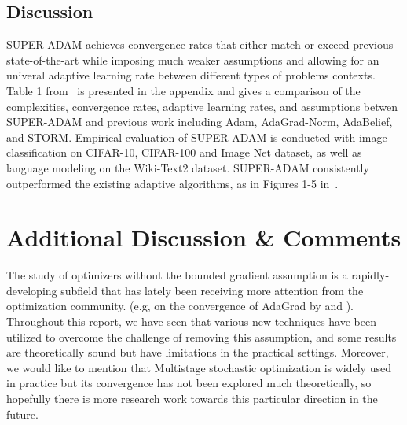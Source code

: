 \documentclass{article}
\begin{document}
\subsection{Discussion}
SUPER-ADAM achieves convergence rates that either match or exceed previous state-of-the-art while imposing much weaker assumptions and allowing for an univeral adaptive learning rate between different types of problems contexts.
Table 1 from~\cite{https://doi.org/10.48550/arxiv.2106.08208} is presented in the appendix and gives a comparison of the complexities, convergence rates, adaptive learning rates, and assumptions betwen SUPER-ADAM and previous work including Adam, AdaGrad-Norm, AdaBelief, and STORM.
Empirical evaluation of SUPER-ADAM is conducted with image classification on CIFAR-10, CIFAR-100 and Image Net dataset, as well as language modeling on the Wiki-Text2 dataset. SUPER-ADAM consistently outperformed the existing adaptive algorithms,
as in Figures 1-5 in~\cite{https://doi.org/10.48550/arxiv.2106.08208}.
\section{Additional Discussion \& Comments}
The study of optimizers without the bounded gradient assumption is a rapidly-developing subfield that has lately been receiving more attention from the optimization community. (e.g, on the convergence of AdaGrad by \cite{jin2022on} and \cite{https://doi.org/10.48550/arxiv.2202.05791}).
Throughout this report, we have seen that various new techniques have been utilized to overcome the challenge of removing this assumption, and some results are theoretically sound but have limitations in the practical settings. Moreover, we would like to mention that Multistage stochastic optimization is widely used in practice but its convergence has not been explored much theoretically, so hopefully there is more research work towards this particular direction in the future.
\newpage


%
\newpage
\appendix
\end{document}

